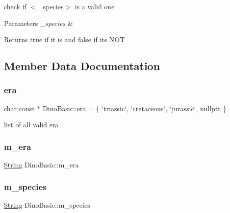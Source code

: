 check if $<$\+\_\+species$>$ is a valid one 
\begin{DoxyParams}{Parameters}
{\em \+\_\+species} & \\
\hline
\end{DoxyParams}
\begin{DoxyReturn}{Returns}
true if it is and false if it\textquotesingle{}s N\+OT 
\end{DoxyReturn}


\subsection{Member Data Documentation}
\mbox{\label{classDinoBasic_a7ff093a0761137d2f6790c601615369e}} 
\subsubsection{\texorpdfstring{era}{era}}
{\footnotesize\ttfamily char const  $\ast$ Dino\+Basic\+::era = \{ \char`\"{}triassic\char`\"{}, \char`\"{}cretaceous\char`\"{}, \char`\"{}jurassic\char`\"{}, nullptr \}\hspace{0.3cm}{\ttfamily [static]}}



list of all valid era 

\mbox{\label{classDinoBasic_aed65c06db4fe56f7a460e0b202ac8023}} 
\subsubsection{\texorpdfstring{m\+\_\+era}{m\_era}}
{\footnotesize\ttfamily \hyperlink{classString}{String} Dino\+Basic\+::m\+\_\+era\hspace{0.3cm}{\ttfamily [protected]}}

\mbox{\label{classDinoBasic_a4579f8f1e6565f5a5f12a86d6b199044}} 
\subsubsection{\texorpdfstring{m\+\_\+species}{m\_species}}
{\footnotesize\ttfamily \hyperlink{classString}{String} Dino\+Basic\+::m\+\_\+species\hspace{0.3cm}{\ttfamily [protected]}}

